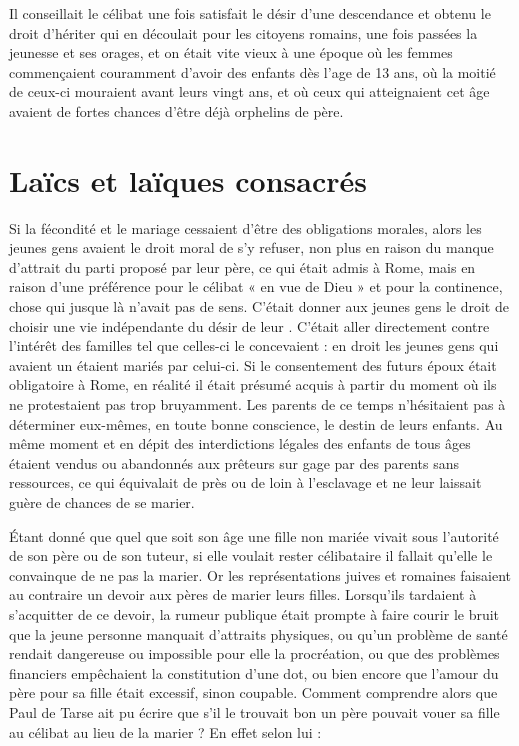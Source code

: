  Il conseillait le célibat une fois satisfait le désir d'une descendance et obtenu le droit d'hériter qui en découlait pour les citoyens romains, une fois passées la jeunesse et ses orages, et on était vite vieux à une époque où les femmes commençaient couramment d'avoir des enfants dès l'age de 13 ans, où la moitié de ceux-ci mouraient avant leurs vingt ans, et où ceux qui atteignaient cet âge avaient de fortes chances d'être déjà orphelins de père. 
 

\section{Laïcs et laïques consacrés}

 Si la fécondité et le mariage cessaient d'être des obligations morales, alors les jeunes gens avaient le droit moral de s'y refuser, non plus en raison du manque d'attrait du parti proposé par leur père, ce qui était admis à Rome, mais en raison d'une préférence pour le célibat « en vue de Dieu » et pour la continence, chose qui jusque là n'avait pas de sens. C'était donner aux jeunes gens le droit de choisir une vie indépendante du désir de leur . C'était aller directement contre l'intérêt des familles tel que celles-ci le concevaient : en droit les jeunes gens qui avaient un  étaient mariés par celui-ci. Si le consentement des futurs époux était obligatoire à Rome, en réalité il était présumé acquis à partir du moment où ils ne protestaient pas trop bruyamment. Les parents de ce temps n'hésitaient pas à déterminer eux-mêmes, en toute bonne conscience, le destin de leurs enfants. Au même moment et en dépit des interdictions légales des enfants de tous âges étaient vendus ou abandonnés aux prêteurs sur gage par des parents sans ressources, ce qui équivalait de près ou de loin à l'esclavage et ne leur laissait guère de chances de se marier.

 Étant donné que quel que soit son âge une fille non mariée vivait sous l'autorité de son père ou de son tuteur, si elle voulait rester célibataire il fallait qu'elle le convainque de ne pas la marier. Or les représentations juives et romaines faisaient au contraire un devoir aux pères de marier leurs filles. Lorsqu'ils tardaient à s'acquitter de ce devoir, la rumeur publique était prompte à faire courir le bruit que la jeune personne manquait d'attraits physiques, ou qu'un problème de santé rendait dangereuse ou impossible pour elle la procréation, ou que des problèmes financiers empêchaient la constitution d'une dot, ou bien encore que l'amour du père pour sa fille était excessif, sinon coupable. Comment comprendre alors que Paul de Tarse ait pu écrire que s'il le trouvait bon un père pouvait vouer sa fille au célibat au lieu de la marier ? En effet selon lui :

